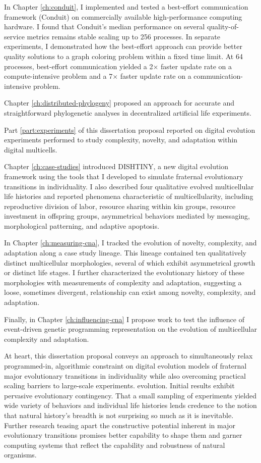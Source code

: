 In Chapter \ref{ch:conduit}, I implemented and tested a best-effort communication framework (Conduit) on commercially available high-performance computing hardware.
I found that Conduit's median performance on several quality-of-service metrics remains stable scaling up to 256 processes.
In separate experiments, I demonstrated how the best-effort approach can provide better quality solutions to a graph coloring problem within a fixed time limit.
At 64 processes, best-effort communication yielded a 2$\times$ faster update rate on a compute-intensive problem and a 7$\times$ faster update rate on a communication-intensive problem.

Chapter \ref{ch:distributed-phylogeny} proposed an approach for accurate and straightforward phylogenetic analyses in decentralized artificial life experiments.

Part \ref{part:experiments} of this dissertation proposal reported on digital evolution experiments performed to study complexity, novelty, and adaptation within digital multicells.

Chapter \ref{ch:case-studies} introduced DISHTINY, a new digital evolution framework using the tools that I developed to simulate fraternal evolutionary transitions in individuality.
I also described four qualitative evolved multicellular life histories and reported phenomena characteristic of multicellularity, including reproductive division of labor, resource sharing within kin groups, resource investment in offspring groups, asymmetrical behaviors mediated by messaging, morphological patterning, and adaptive apoptosis.

In Chapter \ref{ch:measuring-cna}, I tracked the evolution of novelty, complexity, and adaptation along a case study lineage.
This lineage contained ten qualitatively distinct multicellular morphologies, several of which exhibit asymmetrical growth or distinct life stages.
I further characterized the evolutionary history of these morphologies with measurements of complexity and adaptation, suggesting a loose, sometimes divergent, relationship can exist among novelty, complexity, and adaptation.

Finally, in Chapter \ref{ch:influencing-cna} I propose work to test the influence of event-driven genetic programming representation on the evolution of multicellular complexity and adaptation.

At heart, this dissertation proposal conveys an approach to simultaneously relax programmed-in, algorithmic constraint on digital evolution models of fraternal major evolutionary transitions in individuality while also overcoming practical scaling barriers to large-scale experiments.
evolution.
Initial results exhibit pervasive evolutionary contingency.
That a small sampling of experiments yielded wide variety of behaviors and individual life histories lends credence to the notion that natural history's breadth is not surprising so much as it is inevitable.
Further research teasing apart the constructive potential inherent in major evolutionary transitions promises better capability to shape them and garner computing systems that reflect the capability and robustness of natural organisms.

